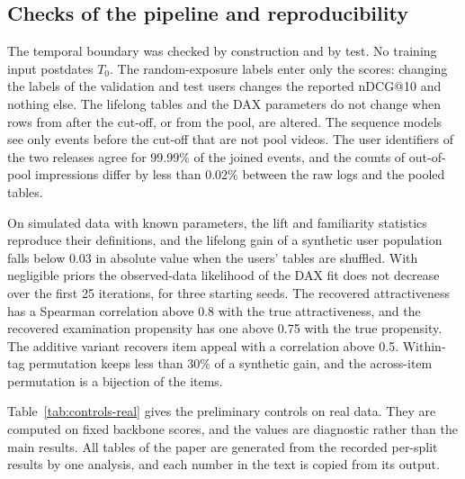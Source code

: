 \subsection{Checks of the pipeline and reproducibility}\label{app:controls}

The temporal boundary was checked by construction and by test. No training input postdates $T_0$. The random-exposure labels enter only the scores:
changing the labels of the validation and test users changes the reported nDCG@10 and nothing else. The lifelong tables and the DAX parameters do not change
when rows from after the cut-off, or from the pool, are altered. The sequence models see only events before the cut-off that are not pool videos. The user
identifiers of the two releases agree for 99.99\% of the joined events, and the counts of out-of-pool impressions differ by less than 0.02\% between the raw
logs and the pooled tables.

On simulated data with known parameters, the lift and familiarity statistics reproduce their definitions, and the lifelong gain of a synthetic user population
falls below 0.03 in absolute value when the users' tables are shuffled. With negligible priors the observed-data likelihood of the DAX fit does not decrease over the first 25
iterations, for three starting seeds. The recovered attractiveness has a Spearman correlation above 0.8 with the true attractiveness, and the recovered
examination propensity has one above 0.75 with the true propensity. The additive variant recovers item appeal with a correlation above 0.5. Within-tag
permutation keeps less than 30\% of a synthetic gain, and the across-item permutation is a bijection of the items.

Table~\ref{tab:controls-real} gives the preliminary controls on real data. They are computed on fixed backbone scores, and the values are diagnostic rather than
the main results. All tables of the paper are generated from the recorded per-split results by one analysis, and each number in the text is copied from its output.


